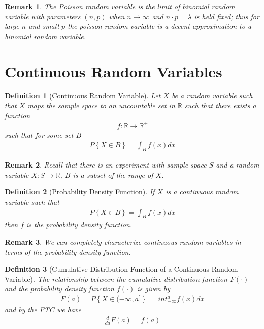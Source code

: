 \documentclass[11pt, oneside]{book}   	%
\newtheorem{definition}{Definition}[chapter]
\newtheorem{remark}{Remark}[chapter]
\begin{document}
\begin{spacing}{1.618}
\begin{remark}
	The Poisson random variable is the limit of binomial random variable with parameters $(n, p)$ when $n\to\infty$ and $n\cdot p=\lambda$ is held fixed; thus for large $n$ and small $p$ the poisson random variable is a decent approximation to a binomial random variable. 
\end{remark}

\section{Continuous Random Variables}

\begin{definition}[Continuous Random Variable]
	Let $X$ be a random variable such that $X$ maps the sample space to an uncountable set in $\mathbb{R}$ such that there exists a function
	\begin{alignat}{4}
		f:\mathbb{R}\to\mathbb{R}^+
	\end{alignat}
	such that for some set $B$ 
	\begin{alignat}{4}
		P\left\{X\in B\right\} = \int_{B}f(x)dx
	\end{alignat}
\end{definition}

\begin{remark}
	Recall that there is an experiment with sample space $S$ and a random variable $X:S\to\mathbb{R}$, $B$ is a subset of the range of $X$. 
\end{remark}

\begin{definition}[Probability Density Function]
	If $X$ is a continuous random variable such that 
	\begin{alignat}{4}
		P\left\{X\in B\right\}=\int_Bf(x)dx
	\end{alignat}
	then $f$ is the probability density function. 
\end{definition}

\begin{remark}
	We can completely characterize continuous random variables in terms of the probability density function.
\end{remark}

\begin{definition}[Cumulative Distribution Function of a Continuous Random Variable]
	The relationship between the cumulative distribution function $F(\cdot)$ and the probability density function $f(\cdot)$ is given by 
	\begin{alignat}{4}
		F(a)=P\left\{X\in (-\infty, a]\right\} = \ int_{-\infty}^af(x)dx
	\end{alignat}
	and by the FTC we have
	\begin{alignat}{4}
		\frac{d}{da}F(a)=f(a)
	\end{alignat}
\end{definition}


\end{spacing}
\end{document}
